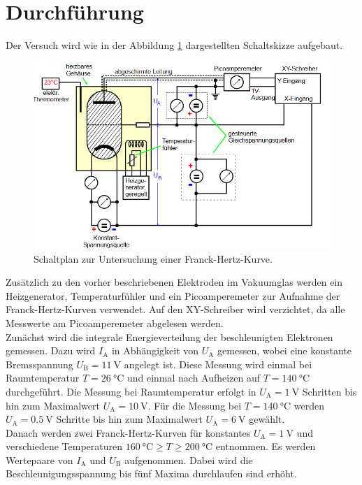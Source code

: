 \section{Durchführung}
\label{sec:Durchführung}
Der Versuch wird wie in der Abbildung \ref{fig:aufd} dargestellten Schaltskizze aufgebaut.
\begin{figure}
    \centering
    \caption{Schaltplan zur Untersuchung einer Franck-Hertz-Kurve.\cite{v601}}
    \label{fig:aufd}
    \includegraphics[width = 0.6 \textwidth]{pics/aufd.png}
\end{figure}
Zusätzlich zu den vorher beschriebenen Elektroden im Vakuumglas werden ein Heizgenerator, Temperaturfühler und ein Picoamperemeter zur Aufnahme der Franck-Hertz-Kurven verwendet.
Auf den XY-Schreiber wird verzichtet, da alle Messwerte am Picoamperemeter abgelesen werden.
\\
Zunächst wird die integrale Energieverteilung der beschleunigten Elektronen gemessen. Dazu wird 
$I_\text{A}$ in Abhängigkeit von $U_\text{A}$ gemessen, wobei eine konstante Bremsspannung $U_\text{B} = \SI{11}{\volt}$ angelegt ist. Diese Messung wird einmal
bei Raumtemperatur $T= \SI{26}{\celsius}$ und einmal nach Aufheizen auf $T=\SI{140}{\celsius}$ durchgeführt. 
Die Messung bei Raumtemperatur erfolgt in $U_\text{A}=\SI{1}{\volt}$ Schritten bis hin zum Maximalwert $U_\text{A}=\SI{10}{\volt}$.
Für die Messung bei $T=\SI{140}{\celsius}$ werden $U_\text{A}=\SI{0.5}{\volt}$ Schritte bis hin zum Maximalwert $U_\text{A}=\SI{6}{\volt}$ gewählt.
\\
Danach werden zwei Franck-Hertz-Kurven für konstantes $U_\text{A}=\SI{1}{\volt}$ und verschiedene Temperaturen $\SI{160}{\celsius} \geq T \geq \SI{200}{\celsius}$
entnommen. Es werden Wertepaare von $I_\text{A}$ und $U_\text{B}$ aufgenommen. Dabei wird die Beschleunigungsspannung bis fünf Maxima durchlaufen sind erhöht.